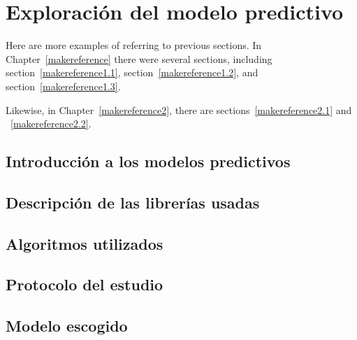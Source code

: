 \cleardoublepage

\chapter{Exploración del modelo predictivo}
\label{makereference3}

Here are more examples of referring to previous sections.  In
Chapter~\ref{makereference} there were several sections, including
section~\ref{makereference1.1}, section~\ref{makereference1.2},
and section~\ref{makereference1.3}.

Likewise, in Chapter~\ref{makereference2}, there are
sections~\ref{makereference2.1} and ~\ref{makereference2.2}.

\section{Introducción a los modelos predictivos}
\label{makereference3.1}

\section{Descripción de las librerías usadas}
\label{makereference3.2}

\section{Algoritmos utilizados}
\label{makereference3.3}

\section{Protocolo del estudio}
\label{makereference3.4}

\section{Modelo escogido}
\label{makereference3.5}